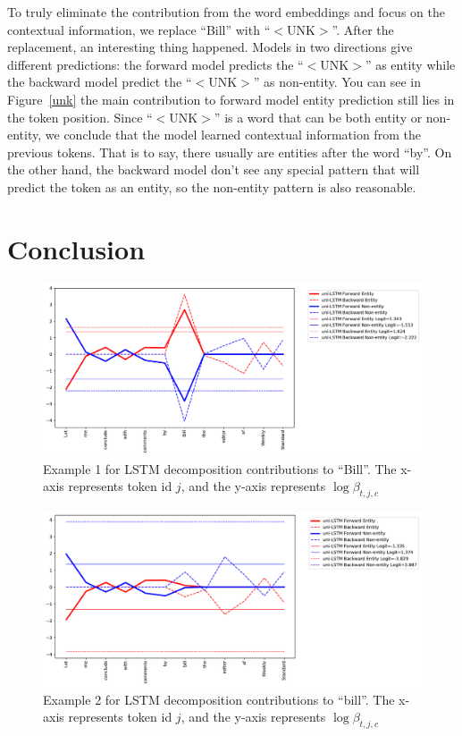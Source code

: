 \documentclass{article}
\begin{document}
To truly eliminate the contribution from the word embeddings and focus on the contextual information, we replace ``Bill'' with ``$<$UNK$>$''. After the replacement, an interesting thing happened. Models in two directions give different predictions: the forward model predicts the ``$<$UNK$>$'' as entity while the backward model predict the ``$<$UNK$>$'' as non-entity. You can see in Figure~\ref{unk} the main contribution to forward model entity prediction still lies in the token position. Since ``$<$UNK$>$'' is a word that can be both entity or non-entity, we conclude that the model learned contextual information from the previous tokens. That is to say, there usually are entities after the word 
``by''. On the other hand, the backward model don't see any special pattern that will predict the token as an entity, so the non-entity pattern is also reasonable. 

\section{Conclusion}


\begin{figure}[t]
	\centering
	\includegraphics[width=\linewidth]{uni-Bill1.pdf}
	\caption{Example 1 for LSTM decomposition contributions to ``Bill''. The x-axis represents token id $j$, and the y-axis represents $\log \beta_{t, j, c}$}
	\label{fig:Bill}
\end{figure}
\nocite{*}

\begin{figure}[t]
	\centering
	\includegraphics[width=\linewidth]{uni-bill2.pdf}
	\caption{Example 2 for LSTM decomposition contributions to ``bill''. The x-axis represents token id $j$, and the y-axis represents $\log \beta_{t, j, c}$}
	\label{fig:bill}
\end{figure}
\end{document}
